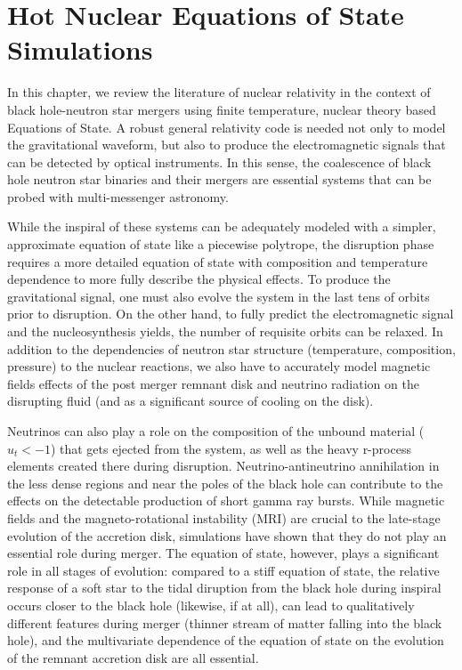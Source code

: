 \chapter{Hot Nuclear Equations of State Simulations}
\label{chap:chapter-4}

In this chapter, we review the literature of nuclear relativity in the context of black hole-neutron star mergers using finite temperature, nuclear theory based Equations of State.  A robust general relativity code is needed not only to model the gravitational waveform, but also to produce the electromagnetic signals that can be detected by optical instruments.  In this sense, the coalescence of black hole neutron star binaries and their mergers are essential systems that can be probed with multi-messenger astronomy.  


While the inspiral of these systems can be adequately modeled with a simpler, approximate equation of state like a piecewise polytrope, the disruption phase requires a more detailed equation of state with composition and temperature dependence to more fully describe the physical effects.  To produce the gravitational signal, one must also evolve the system in the last tens of orbits prior to disruption.  On the other hand, to fully predict the electromagnetic signal and the nucleosynthesis yields, the number of requisite orbits can be relaxed.  In addition to the dependencies of neutron star structure (temperature, composition, pressure) to the nuclear reactions, we also have to accurately model magnetic fields effects of the post merger remnant disk and neutrino radiation on the disrupting fluid (and as a significant source of cooling on the disk).

Neutrinos can also play a role on the composition of the unbound material ($u_t < -1$) that gets ejected from the system, as well as the heavy r-process elements created there during disruption. Neutrino-antineutrino annihilation in the less dense regions and near the poles of the black hole can contribute to the effects on the detectable production of short gamma ray bursts.  While magnetic fields and the magneto-rotational instability (MRI) are crucial to the late-stage evolution of the accretion disk, simulations have shown that they do not play an essential role during merger.  The equation of state, however, plays a significant role in all stages of evolution: compared to a stiff equation of state, the relative response of a soft star to the tidal diruption from the black hole during inspiral occurs closer to the black hole (likewise, if at all), can lead to qualitatively different features during merger (thinner stream of matter falling into the black hole), and the multivariate dependence of the equation of state on the evolution of the remnant accretion disk are all essential.


